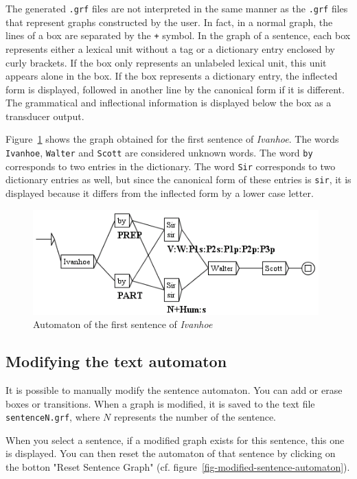 \bigskip
\noindent The generated \verb+.grf+ files are not interpreted in the same manner
as the \verb+.grf+ files that represent graphs constructed by the user. In fact,
in a normal graph, the lines of a box are separated by the \verb$+$ symbol. In
the graph of a sentence, each box represents either a lexical unit without a tag
or a dictionary entry enclosed by curly brackets. If the box only represents an
unlabeled lexical unit, this unit appears alone in the box. If the box represents
a dictionary entry, the inflected form is displayed, followed in another line by
the canonical form if it is different. The grammatical and inflectional
information is  displayed below the box as a transducer output.


\bigskip
\noindent Figure~\ref{fig-first-sentence-Ivanhoe} shows
the graph obtained for the first sentence of \textit{Ivanhoe}. The words \verb+Ivanhoe+,
\verb+Walter+ and \verb+Scott+ are considered unknown words. The word \verb+by+
corresponds to two entries in the dictionary. The word \verb+Sir+ corresponds to
two dictionary entries as well, but since the canonical form of these entries is
\verb+sir+, it is displayed because it differs from the inflected form by a lower
case letter.

\begin{figure}[!ht]
\begin{center}
\includegraphics[width=11cm]{resources/img/fig7-23.png}
\caption{Automaton of the first sentence of \textit{Ivanhoe}\label{fig-first-sentence-Ivanhoe}}
\end{center}
\end{figure}

\subsection{Modifying the text automaton}
It is possible to manually modify the sentence automaton. You can add or erase
boxes or transitions. When a graph is modified, it is saved to the text file  
\verb+sentenceN.grf+, where $N$ represents the number of the sentence.

\bigskip
\noindent When you select a sentence, if a modified graph exists for this sentence, this
one is displayed. You can then reset the automaton of that sentence by clicking
on the botton "Reset Sentence Graph" (cf. 
figure~\ref{fig-modified-sentence-automaton}).

